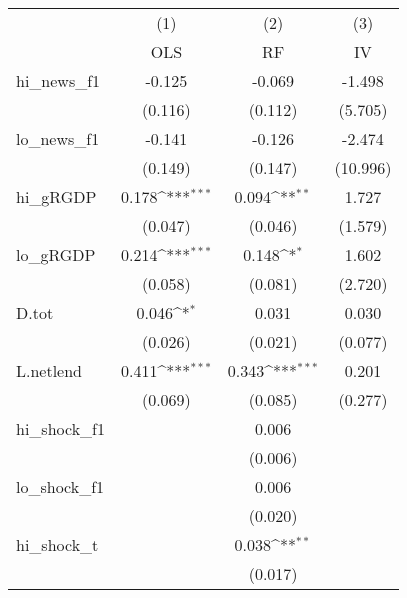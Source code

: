 {
\def\sym#1{\ifmmode^{#1}\else\(^{#1}\)\fi}
\begin{tabular}{l*{3}{c}}
\toprule
            &\multicolumn{1}{c}{(1)}&\multicolumn{1}{c}{(2)}&\multicolumn{1}{c}{(3)}\\
            &\multicolumn{1}{c}{OLS}&\multicolumn{1}{c}{RF}&\multicolumn{1}{c}{IV}\\
\midrule
hi\_news\_f1  &      -0.125         &      -0.069         &      -1.498         \\
            &     (0.116)         &     (0.112)         &     (5.705)         \\
\addlinespace
lo\_news\_f1  &      -0.141         &      -0.126         &      -2.474         \\
            &     (0.149)         &     (0.147)         &    (10.996)         \\
\addlinespace
hi\_gRGDP    &       0.178\sym{***}&       0.094\sym{**} &       1.727         \\
            &     (0.047)         &     (0.046)         &     (1.579)         \\
\addlinespace
lo\_gRGDP    &       0.214\sym{***}&       0.148\sym{*}  &       1.602         \\
            &     (0.058)         &     (0.081)         &     (2.720)         \\
\addlinespace
D.tot       &       0.046\sym{*}  &       0.031         &       0.030         \\
            &     (0.026)         &     (0.021)         &     (0.077)         \\
\addlinespace
L.netlend   &       0.411\sym{***}&       0.343\sym{***}&       0.201         \\
            &     (0.069)         &     (0.085)         &     (0.277)         \\
\addlinespace
hi\_shock\_f1 &                     &       0.006         &                     \\
            &                     &     (0.006)         &                     \\
\addlinespace
lo\_shock\_f1 &                     &       0.006         &                     \\
            &                     &     (0.020)         &                     \\
\addlinespace
hi\_shock\_t  &                     &       0.038\sym{**} &                     \\
            &                     &     (0.017)         &                     \\

\end{tabular}}
